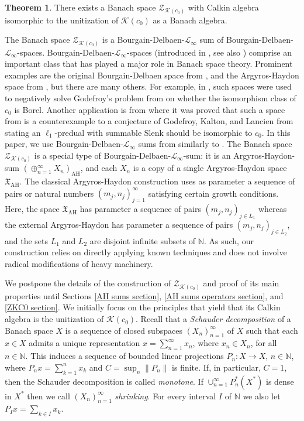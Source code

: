 \documentclass[11pt]{amsart}
\theoremstyle{definition}
\newtheorem*{theorem*}{Theorem}
\newcommand{\N}{\mathbb{N}}
\numberwithin{equation}{section}
\begin{document}
\begin{theorem*}
There exists a Banach space $\mathcal{Z}_{\mathcal{K}(c_0)}$ with Calkin algebra isomorphic to the unitization of $\mathcal{K}(c_0)$ as a Banach algebra.
\end{theorem*}

The Banach space $\mathcal{Z}_{\mathcal{K}(c_0)}$ is a Bourgain-Delbaen-$\mathscr{L}_\infty$ sum  of Bourgain-Delbaen-$\mathscr{L}_\infty$-spaces. Bourgain-Delbaen-$\mathscr{L}_\infty$-spaces (introduced in \cite{bourgain:delbaen:1980}, see also \cite{argyros:gasparis:motakis:2016}) comprise an important class that has played a major role in Banach space theory. Prominent examples are the original Bourgain-Delbaen space from \cite{bourgain:delbaen:1980}, and the Argyros-Haydon space from \cite{argyros:haydon:2011}, but there are many others. For example, in \cite{kurka:2019}, such spaces were used to negatively solve Godefroy's problem from \cite{godefroy:2010} on whether the isomorphism class of $c_0$ is Borel. Another application is from \cite{causey:2020} where it was proved that such a space from \cite{argyros:gasparis:motakis:2016} is a counterexample to a conjecture of Godefroy, Kalton, and Lancien from \cite{godefroy:kalton:lancien:2001} stating an $\ell_1$-predual with summable Slenk should be isomorphic to $c_0$. In this paper, we use Bourgain-Delbaen-$\mathscr{L}_\infty$ sums from \cite{zisimopoulou:2014} similarly to \cite{motakis:puglisi:zisimopoulou:2016}. The Banach space $\mathcal{Z}_{\mathcal{K}(c_0)}$ is a special type of Bourgain-Delbaen-$\mathscr{L}_\infty$-sum: it is an Argyros-Haydon-sum $(\oplus_{n=1}^\infty X_n)_\mathrm{AH}$, and each $X_n$ is a copy of a single Argyros-Haydon space $\mathfrak{X}_\mathrm{AH}$. The classical Argyros-Haydon construction uses as parameter a sequence of pairs or natural numbers $(m_j,n_j)_{j=1}^\infty$ satisfying certain growth conditions. Here, the space $\mathfrak{X}_\mathrm{AH}$ has parameter a sequence of pairs $(m_j,n_j)_{j\in L_1}$ whereas the external Argyros-Haydon has parameter a sequence of pairs $(m_j,n_j)_{j\in L_2}$, and the sets $L_1$ and $L_2$ are disjoint infinite subsets of $\N$. As such, our construction relies on directly applying known techniques and does not involve radical modifications of heavy machinery.

We postpone the details of the construction of $\mathcal{Z}_{\mathcal{K}(c_0)}$ and proof of its main properties until Sections \ref{AH sums section}, \ref{AH sums operators section}, and \ref{ZKC0 section}. We initially focus on the principles that yield that its Calkin algebra is the unitization of $\mathcal{K}(c_0)$. Recall that a {\em Schauder decomposition} of a Banach space $X$ is a sequence of closed subspaces $(X_n)_{n=1}^\infty$ of $X$ such that each $x\in X$ admits a unique representation $x = \sum_{n=1}^\infty x_n$, where $x_n\in X_n$, for all $n\in\N$. This induces a sequence of bounded linear projections $P_n:X\to X$, $n\in\N$, where $P_nx = \sum_{k=1}^nx_k$ and $C = \sup_n\|P_n\|$ is finite. If, in particular, $C=1$, then the Schauder decomposition is called {\em monotone}. If $\cup_{n=1}^\infty P_n^*(X^*)$ is dense in $X^*$ then we call $(X_n)_{n=1}^\infty$ {\em shrinking}. For every interval $I$ of $\N$ we also let $P_Ix = \sum_{k\in I}x_k$.
\end{document}
